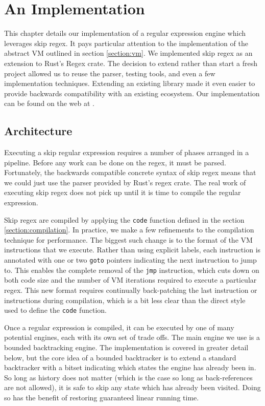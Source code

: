 \chapter{An Implementation}
\label{chapter:implementation}

This chapter details our implementation of a regular expression
engine which leverages skip regex. It pays particular attention
to the implementation of the abstract VM outlined in section
\ref{section:vm}. We implemented skip regex as
an extension to Rust's Regex crate. The decision to extend rather
than start a fresh project allowed us to reuse the parser,
testing tools, and even a few implementation techniques. Extending
an existing library made it even easier to provide backwards
compatibility with an existing ecosystem. Our implementation
can be found on the web at \cite{PailesSkipRegex}.

\section{Architecture}

Executing a skip regular expression requires a number of phases
arranged in a pipeline. Before any work can be done on the regex,
it must be parsed. Fortunately, the backwards compatible concrete
syntax of skip regex means that we could just use the parser provided
by Rust's regex crate. The real work of executing skip regex does not
pick up until it is time to compile the regular expression.

Skip regex are compiled by applying the \verb'code' function defined
in the section \ref{section:compilation}. In practice, we make a
few refinements to the compilation technique for performance.
The biggest such change
is to the format of the VM instructions that we execute. Rather than
using explicit labels, each instruction is annotated with one or
two \verb'goto' pointers indicating the next instruction to jump to.
This enables the complete removal of the \verb'jmp' instruction, which
cuts down on both code size and the number of VM iterations required to execute
a particular regex. This new format requires continually back-patching
the last instruction or instructions during compilation, which is a bit
less clear than the direct style used to define the \verb'code' function.

Once a regular expression is compiled, it can be executed by one
of many potential engines, each with its own set of trade offs.
The main engine we use is a bounded backtracking engine. The
implementation is covered in greater detail below, but the core
idea of a bounded backtracker is to extend a standard backtracker
with a bitset indicating which states the engine has already
been in. So long as history does not matter (which is the case
so long as back-references are not allowed), it is safe to skip any
state which has already been visited. Doing so has the benefit
of restoring guaranteed linear running time.

